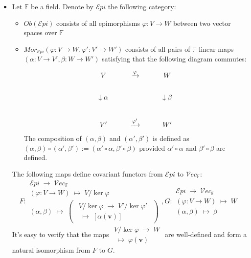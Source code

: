 \begin{itemize}
    \item Let $\mathbb{F}$ be a field. Denote by $\mathcal{E}pi$ the following category:
    \begin{itemize}
        \item $Ob(\mathcal{E}pi)$ consists of all epimorphisms $\varphi: V \to W$ between two vector spaces over $\mathbb{F}$
        \item $Mor_{\mathcal{E}pi} (\varphi : V \to W, \varphi': V' \to W')$ consists of all pairs of $\mathbb{F}$-linear maps $(\alpha: V \to V', \beta: W \to W')$ satisfying that the following diagram commutes:
        $$\begin{tikzcd}
            V &\xrightarrow[]{\varphi}& W\\
            \downarrow \alpha && \downarrow \beta\\
            V' &\xrightarrow[]{\varphi'}& W'
        \end{tikzcd}$$
        The composition of $(\alpha, \beta)$ and $(\alpha' ,\beta')$ is defined as $(\alpha, \beta) \circ (\alpha', \beta') := (\alpha' \circ \alpha , \beta' \circ \beta)$ provided $\alpha' \circ \alpha$ and $\beta' \circ \beta$ are defined.
    \end{itemize}
    The following maps define covariant functors from $\mathcal{E}pi$ to $\mathcal{V}ec_\mathbb{F}$:
    $$F: \substack{\mathcal{E}pi \; \to \; \mathcal{V}ec_\mathbb{F}\\
    (\varphi: V \to W) \; \mapsto \; V/\ker \varphi\\
    (\alpha,\beta) \; \mapsto \; \begin{pmatrix}
        \substack{V/\ker \varphi \; \to \; V'/\ker \varphi'\\
        [\mathbf{v}] \; \mapsto \; [\alpha (\mathbf{v})]}
    \end{pmatrix}} , G: \substack{\mathcal{E}pi \; \to \; \mathcal{V}ec_\mathbb{F}\\
    (\varphi: V \to W) \; \mapsto \; W\\
    (\alpha,\beta) \; \mapsto \; \beta}$$
    It's easy to verify that the maps $\substack{V/\ker \varphi \; \to \; W\\
    [\mathbf{v}] \; \mapsto \; \varphi(\mathbf{v})}$ are well-defined and form a natural isomorphism from $F$ to $G$.


\end{itemize}
